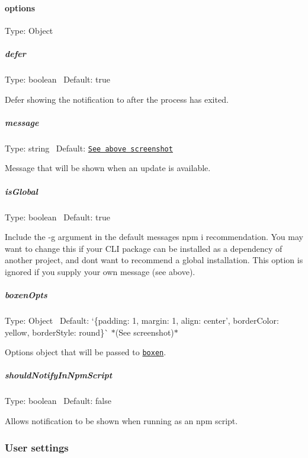 \paragraph*{options}

Type\+: {\ttfamily Object}

\subparagraph*{defer}

Type\+: {\ttfamily boolean}~\newline
 Default\+: {\ttfamily true}

Defer showing the notification to after the process has exited.

\subparagraph*{message}

Type\+: {\ttfamily string}~\newline
 Default\+: \href{https://github.com/yeoman/update-notifier#update-notifier-}{\tt See above screenshot}

Message that will be shown when an update is available.

\subparagraph*{is\+Global}

Type\+: {\ttfamily boolean}~\newline
 Default\+: {\ttfamily true}

Include the {\ttfamily -\/g} argument in the default message\textquotesingle{}s {\ttfamily npm i} recommendation. You may want to change this if your C\+LI package can be installed as a dependency of another project, and don\textquotesingle{}t want to recommend a global installation. This option is ignored if you supply your own {\ttfamily message} (see above).

\subparagraph*{boxen\+Opts}

Type\+: {\ttfamily Object}~\newline
 Default\+: `\{padding\+: 1, margin\+: 1, align\+: \textquotesingle{}center', border\+Color\+: \textquotesingle{}yellow\textquotesingle{}, border\+Style\+: \textquotesingle{}round\textquotesingle{}\}\`{} $\ast$(See screenshot)$\ast$

Options object that will be passed to \href{https://github.com/sindresorhus/boxen}{\tt {\ttfamily boxen}}.

\subparagraph*{should\+Notify\+In\+Npm\+Script}

Type\+: {\ttfamily boolean}~\newline
 Default\+: {\ttfamily false}

Allows notification to be shown when running as an npm script.

\subsubsection*{User settings}

